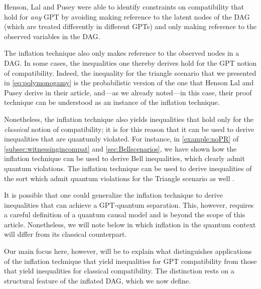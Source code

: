 
Henson, Lal and Pusey\cite{pusey2014gdag} were able to identify constraints on compatibility that hold for {\em any} GPT by  avoiding making reference to the latent nodes of the DAG (which are treated differently in different GPTs) and only making reference to the observed variables in the DAG.   

The inflation technique also only makes reference to the observed nodes in a DAG.  In some cases, the inequalities one thereby derives hold for the GPT notion of compatibility.  Indeed, the inequality for the triangle scenario that we presented in \cref{eq:polymonogamy} is the probabilistic version of the one that Henson Lal and Pusey derive in their article, and---as we already noted---in this case, their proof technique can be understood as an instance of the inflation technique. 

Nonetheless, the inflation technique also yields inequalities that hold only for the {\em classical} notion of compatibility; it is for this reason that it can be used to derive inequalities that are quantumly violated.  For instance, in \cref{example:noPR} of \cref{subsec:witnessingincompat} and \cref{sec:Bellscenarios}, we have shown how the inflation technique can be used to derive Bell inequalities, which clearly admit quantum violations. The inflation technique can be used to derive inequalities of the sort which admit quantum violations for the Triangle scenario as well \cite{TC2016trianglequantum}.

It is possible that one could generalize the inflation technique to derive inequalities that can achieve a GPT-quantum separation. This, however, requires a careful definition of a quantum causal model and is beyond the scope of this article.  Nonetheless, we will note below in which inflation in the quantum context will differ from its classical counterpart. 

Our main focus here, however, will be to explain 
what distinguishes applications of the inflation technique that yield inequalities for GPT compatibility from those that yield inequalities for classical compatibility.   The distinction rests on a structural feature of the inflated DAG, which we now define.

